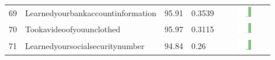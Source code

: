 \documentclass[a4paper,12pt]{article}
\begin{document}
\begin{longtable}{| p{0.5cm} | p{7cm} | p{1cm} |p{1cm} | c |}
69 & Learnedyourbankaccountinformation & 95.91 & 0.3539&\includegraphics[width = 2cm, height = 0.5cm]{tables/learnedyourbankaccountinformationcombined} \\ 
70 & Tookavideoofyouunclothed & 95.97 & 0.3115&\includegraphics[width = 2cm, height = 0.5cm]{tables/tookavideoofyouunclothedcombined} \\ 
71 & Learnedyoursocialsecuritynumber & 94.84 & 0.26&\includegraphics[width = 2cm, height = 0.5cm]{tables/learnedyoursocialsecuritynumbercombined} \\ 
\end{longtable}
\end{document}
